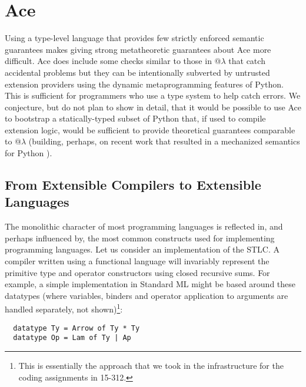 \section{Ace}\label{ace}
 Using a type-level language that provides few strictly enforced semantic guarantees makes giving strong metatheoretic guarantees about Ace more difficult. Ace does include some checks similar to those in @$\lambda$ that catch accidental problems but they can be intentionally subverted by untrusted extension providers using the dynamic metaprogramming features of Python. This is sufficient for programmers who use a type system to help catch errors. We conjecture, but do not plan to show in detail, that it would be possible to use Ace to bootstrap a statically-typed subset of Python that, if used to compile extension logic, would be sufficient to provide theoretical guarantees comparable to @$\lambda$ (building, perhaps, on recent work that resulted in a mechanized semantics for Python \cite{pysem}).
%

\subsection{From Extensible Compilers to Extensible Languages}\label{evolution}
The monolithic character of most programming languages is reflected in, and perhaps influenced by, the most common constructs used for implementing programming languages.
Let us consider an implementation of the STLC. 
A compiler written using a functional language will invariably represent the primitive type  and operator constructors using {closed} recursive sums. 
For example, a simple implementation in Standard ML might be based around these datatypes (where variables, binders and operator application to arguments are handled separately, not shown)\footnote{This is essentially the approach that we took in the infrastructure for the coding assignments in 15-312.}:
\begin{lstlisting}
  datatype Ty = Arrow of Ty * Ty
  datatype Op = Lam of Ty | Ap 
\end{lstlisting}

